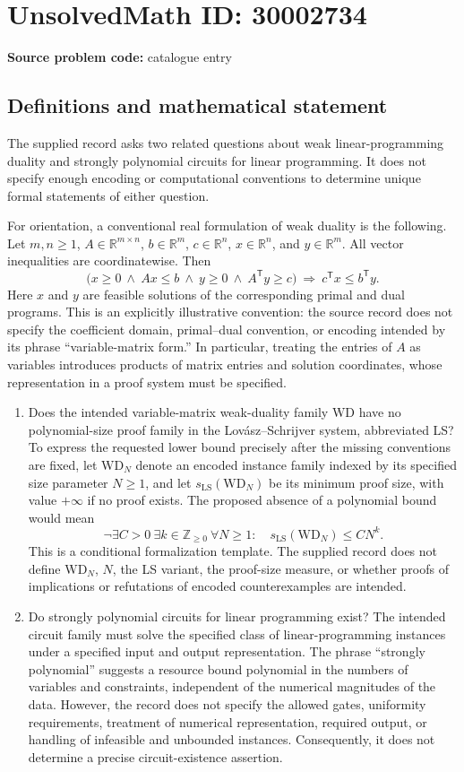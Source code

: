 \documentclass[11pt]{article}
\newcommand{\Z}{\mathbb{Z}}
\newcommand{\R}{\mathbb{R}}
\begin{document}
\section*{UnsolvedMath ID: 30002734}
\textbf{Source problem code:} catalogue entry
\subsection{Definitions and mathematical statement}
The supplied record asks two related questions about weak linear-programming duality and strongly polynomial circuits for linear programming. It does not specify enough encoding or computational conventions to determine unique formal statements of either question.

For orientation, a conventional real formulation of weak duality is the following. Let \(m,n\geq 1\), \(A\in\R^{m\times n}\), \(b\in\R^m\), \(c\in\R^n\), \(x\in\R^n\), and \(y\in\R^m\). All vector inequalities are coordinatewise. Then
\[
\bigl(x\geq 0\ \land\ Ax\leq b\ \land\ y\geq 0\ \land\ A^{\mathsf T}y\geq c\bigr)
\ \Longrightarrow\ c^{\mathsf T}x\leq b^{\mathsf T}y.
\]
Here \(x\) and \(y\) are feasible solutions of the corresponding primal and dual programs. This is an explicitly illustrative convention: the source record does not specify the coefficient domain, primal--dual convention, or encoding intended by its phrase ``variable-matrix form.'' In particular, treating the entries of \(A\) as variables introduces products of matrix entries and solution coordinates, whose representation in a proof system must be specified.

\begin{enumerate}
\item Does the intended variable-matrix weak-duality family \(\mathrm{WD}\) have no polynomial-size proof family in the Lov\'asz--Schrijver system, abbreviated LS? To express the requested lower bound precisely after the missing conventions are fixed, let \(\mathrm{WD}_N\) denote an encoded instance family indexed by its specified size parameter \(N\geq 1\), and let \(s_{\mathrm{LS}}(\mathrm{WD}_N)\) be its minimum proof size, with value \(+\infty\) if no proof exists. The proposed absence of a polynomial bound would mean
\[
\neg\exists C>0\ \exists k\in\Z_{\geq 0}\ \forall N\geq 1:\quad
s_{\mathrm{LS}}(\mathrm{WD}_N)\leq C N^k.
\]
This is a conditional formalization template. The supplied record does not define \(\mathrm{WD}_N\), \(N\), the LS variant, the proof-size measure, or whether proofs of implications or refutations of encoded counterexamples are intended.
\item Do strongly polynomial circuits for linear programming exist? The intended circuit family must solve the specified class of linear-programming instances under a specified input and output representation. The phrase ``strongly polynomial'' suggests a resource bound polynomial in the numbers of variables and constraints, independent of the numerical magnitudes of the data. However, the record does not specify the allowed gates, uniformity requirements, treatment of numerical representation, required output, or handling of infeasible and unbounded instances. Consequently, it does not determine a precise circuit-existence assertion.
\end{enumerate}
\end{document}
